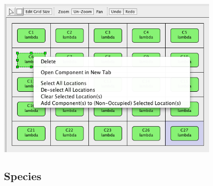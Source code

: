 \documentclass[titlepage,11pt]{article}
\begin{document}
\begin{center}
\includegraphics[height=80mm]{screenshots/gridRightButton}
\end{center}

\subsection{\label{Species}Species}
\end{document}
